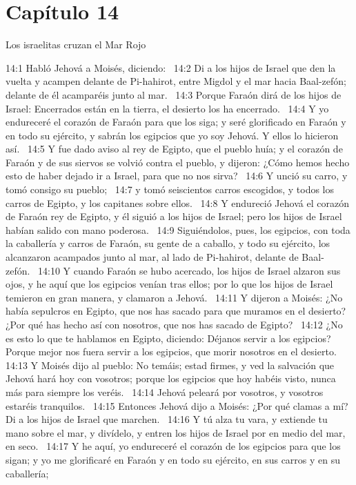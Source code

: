\section*{Capítulo 14}
Los israelitas cruzan el Mar Rojo  

14:1 Habló Jehová a Moisés, diciendo:  
14:2 Di a los hijos de Israel que den la vuelta y acampen delante de Pi-hahirot, entre Migdol y el mar hacia Baal-zefón; delante de él acamparéis junto al mar.  
14:3 Porque Faraón dirá de los hijos de Israel: Encerrados están en la tierra, el desierto los ha encerrado.  
14:4 Y yo endureceré el corazón de Faraón para que los siga; y seré glorificado en Faraón y en todo su ejército, y sabrán los egipcios que yo soy Jehová. Y ellos lo hicieron así.  
14:5 Y fue dado aviso al rey de Egipto, que el pueblo huía; y el corazón de Faraón y de sus siervos se volvió contra el pueblo, y dijeron: ¿Cómo hemos hecho esto de haber dejado ir a Israel, para que no nos sirva?  
14:6 Y unció su carro, y tomó consigo su pueblo;  
14:7 y tomó seiscientos carros escogidos, y todos los carros de Egipto, y los capitanes sobre ellos.  
14:8 Y endureció Jehová el corazón de Faraón rey de Egipto, y él siguió a los hijos de Israel; pero los hijos de Israel habían salido con mano poderosa.  
14:9 Siguiéndolos, pues, los egipcios, con toda la caballería y carros de Faraón, su gente de a caballo, y todo su ejército, los alcanzaron acampados junto al mar, al lado de Pi-hahirot, delante de Baal-zefón.  
14:10 Y cuando Faraón se hubo acercado, los hijos de Israel alzaron sus ojos, y he aquí que los egipcios venían tras ellos; por lo que los hijos de Israel temieron en gran manera, y clamaron a Jehová.  
14:11 Y dijeron a Moisés: ¿No había sepulcros en Egipto, que nos has sacado para que muramos en el desierto? ¿Por qué has hecho así con nosotros, que nos has sacado de Egipto?  
14:12 ¿No es esto lo que te hablamos en Egipto, diciendo: Déjanos servir a los egipcios? Porque mejor nos fuera servir a los egipcios, que morir nosotros en el desierto.  
14:13 Y Moisés dijo al pueblo: No temáis; estad firmes, y ved la salvación que Jehová hará hoy con vosotros; porque los egipcios que hoy habéis visto, nunca más para siempre los veréis.  
14:14 Jehová peleará por vosotros, y vosotros estaréis tranquilos.  
14:15 Entonces Jehová dijo a Moisés: ¿Por qué clamas a mí? Di a los hijos de Israel que marchen.  
14:16 Y tú alza tu vara, y extiende tu mano sobre el mar, y divídelo, y entren los hijos de Israel por en medio del mar, en seco.  
14:17 Y he aquí, yo endureceré el corazón de los egipcios para que los sigan; y yo me glorificaré en Faraón y en todo su ejército, en sus carros y en su caballería;  
